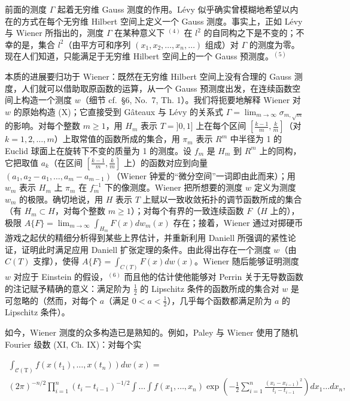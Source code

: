 前面的测度 \(\Gamma\) 起着无穷维 Gauss 测度的作用。Lévy 似乎确实曾模糊地希望以内在的方式在每个无穷维 Hilbert 空间上定义一个 Gauss 测度。事实上，正如 Lévy 与 Wiener 所指出的，测度 \(\Gamma\) 在某种意义下 \(^{(4)}\) 在 \(l^{2}\) 的自同构之下是不变的；不幸的是，集合 \(l^{2}\)（由平方可和序列 \((x_{1}, x_{2}, \ldots, x_{n}, \ldots)\) 组成）对 \(\Gamma\) 的测度为零。现在人们知道，只能满足于无穷维 Hilbert 空间上的一个 Gauss 预测度。\(^{(5)}\)

本质的进展要归功于 Wiener：既然在无穷维 Hilbert 空间上没有合理的 Gauss 测度，人们就可以借助取原函数的运算，从一个 Gauss 预测度出发，在连续函数空间上构造一个测度 \(w\)（细节 cf.~§6, No.~7, Th. 1）。我们将扼要地解释 Wiener 对 \(w\) 的原始构造 (X)；它直接受到 Gâteaux 与 Lévy 的关系式 \(\Gamma = \lim_{m \to \infty} \sigma_{m,\sqrt{m}}\) 的影响。对每个整数 \(m \geqslant 1\)，用 \(H_m\) 表示 \(T = ]0,1]\) 上在每个区间 \(\left[ \frac{k-1}{m}, \frac{k}{m} \right]\)（对 \(k = 1,2,\ldots,m\)）上取常值的函数所成的集合，用 \(\pi_m\) 表示 \(R^m\) 中半径为 1 的 Euclid 球面上在旋转下不变的质量为 1 的测度。设 \(f_m\) 是 \(H_m\) 到 \(R^m\) 上的同构，它把取值 \(a_k\)（在区间 \(\left[ \frac{k-1}{m}, \frac{k}{m} \right]\) 上）的函数对应到向量 \((a_1, a_2 - a_1, \ldots, a_m - a_{m-1})\)（Wiener 钟爱的“微分空间”一词即由此而来）；用 \(w_m\) 表示 \(H_m\) 上 \(\pi_m\) 在 \(f_m^{-1}\) 下的像测度。Wiener 把所想要的测度 \(w\) 定义为测度 \(w_m\) 的极限。确切地说，用 \(H\) 表示 \(T\) 上赋以一致收敛拓扑的调节函数所成的集合（有 \(H_m \subset H\)，对每个整数 \(m \geqslant 1\)）；对每个有界的一致连续函数 \(F\)（\(H\) 上的），极限 \(A\{F\} = \lim_{m \to \infty} \int_{H_m} F(x) dw_m(x)\) 存在；接着，Wiener 通过对掷硬币游戏之起伏的精细分析得到某些上界估计，并重新利用 Daniell 所强调的紧性论证，证明此时满足应用 Daniell 扩张定理的条件。由此得出存在一个测度 \(w\)（由 \(C(T)\) 支撑），使得 \(A\{F\} = \int_{C(T)} F(x) dw(x)\)。Wiener 随后能够证明测度 \(w\) 对应于 Einstein 的假设，\(^{(6)}\) 而且他的估计使他能够对 Perrin 关于无导数函数的注记赋予精确的意义：满足阶为 \(\frac{1}{2}\) 的 Lipschitz 条件的函数所成的集合对 \(w\) 是可忽略的（然而，对每个 \(a\)（满足 \(0 < a < \frac{1}{2}\)），几乎每个函数都满足阶为 \(a\) 的 Lipschitz 条件）。

如今，Wiener 测度的众多构造已是熟知的。例如，Paley 与 Wiener 使用了随机 Fourier 级数 (XI, Ch. IX)：对每个实

\[
\begin{array}{l} \int_ {\mathcal {C} (\mathrm{T})} f (x (t _ {1}), \dots , x (t _ {n})) d w (x) = \\ (2 \pi) ^ {- n / 2} \prod_ {i = 1} ^ {n} (t _ {i} - t _ {i - 1}) ^ {- 1 / 2} \int \dots \int f (x _ {1}, \dots , x _ {n}) \exp \left(- \frac {1}{2} \sum_ {i = 1} ^ {n} \frac {(x _ {i} - x _ {i - 1}) ^ {2}}{t _ {i} - t _ {i - 1}}\right) d x _ {1} \dots d x _ {n}, \end{array}
\]

